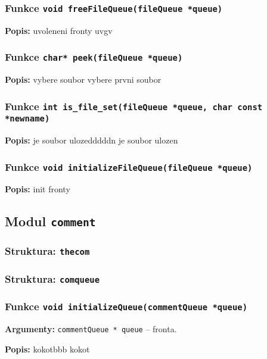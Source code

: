 \documentclass[12pt, a4paper]{article}
\begin{document}
\subsubsection{Funkce \texttt{void freeFileQueue(fileQueue *queue)}}
\textbf{Popis: }uvoleneni fronty uvgv\\
\par\noindent
\subsubsection{Funkce \texttt{char* peek(fileQueue *queue)}}
\textbf{Popis: }vybere soubor vybere prvni soubor\\
\par\noindent
\subsubsection{Funkce \texttt{int is\_file\_set(fileQueue *queue, char const *newname)}}
\textbf{Popis: }je soubor ulozedddddn je soubor ulozen\\
\par\noindent
\subsubsection{Funkce \texttt{void initializeFileQueue(fileQueue *queue)}}
\textbf{Popis: }init fronty\\
\par\noindent
\subsection{Modul \texttt{comment}}
\subsubsection{Struktura: \texttt{thecom }}
\subsubsection{Struktura: \texttt{comqueue }}
\subsubsection{Funkce \texttt{void initializeQueue(commentQueue *queue)}}
\textbf{Argumenty: }\verb"commentQueue * queue" -- fronta. \\
\par\noindent
\textbf{Popis: }kokotbbb kokot\\
\par\noindent
\end{document}
